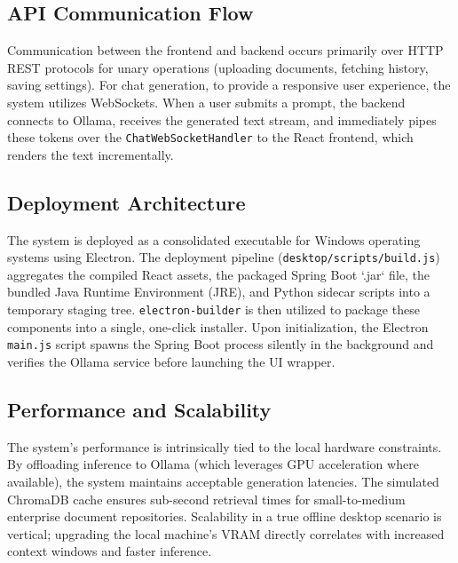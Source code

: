 \subsection{API Communication Flow}
Communication between the frontend and backend occurs primarily over HTTP REST protocols for unary operations (uploading documents, fetching history, saving settings). For chat generation, to provide a responsive user experience, the system utilizes WebSockets. When a user submits a prompt, the backend connects to Ollama, receives the generated text stream, and immediately pipes these tokens over the \texttt{ChatWebSocketHandler} to the React frontend, which renders the text incrementally.

\subsection{Deployment Architecture}
The system is deployed as a consolidated executable for Windows operating systems using Electron. The deployment pipeline (\texttt{desktop/scripts/build.js}) aggregates the compiled React assets, the packaged Spring Boot `.jar` file, the bundled Java Runtime Environment (JRE), and Python sidecar scripts into a temporary staging tree. \texttt{electron-builder} is then utilized to package these components into a single, one-click installer. Upon initialization, the Electron \texttt{main.js} script spawns the Spring Boot process silently in the background and verifies the Ollama service before launching the UI wrapper.

\subsection{Performance and Scalability}
The system's performance is intrinsically tied to the local hardware constraints. By offloading inference to Ollama (which leverages GPU acceleration where available), the system maintains acceptable generation latencies. The simulated ChromaDB cache ensures sub-second retrieval times for small-to-medium enterprise document repositories. Scalability in a true offline desktop scenario is vertical; upgrading the local machine's VRAM directly correlates with increased context windows and faster inference.

